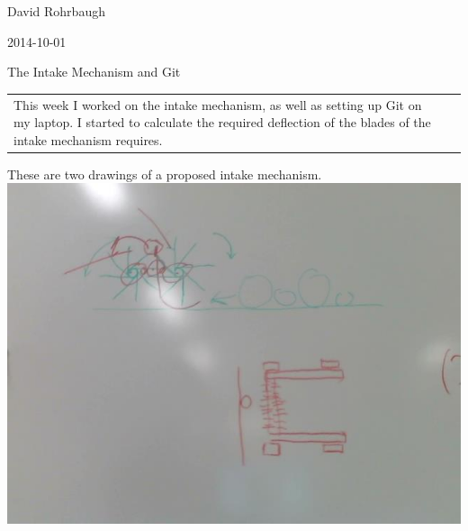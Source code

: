 David Rohrbaugh

2014-10-01

The Intake Mechanism and Git

\begin{tabular}{|p{5cm}|p{5cm}|}
 \hline
 This week I worked on the intake mechanism, as well as setting up Git on my laptop. I started to calculate the required deflection of the blades of the intake mechanism requires.
 \hline
\end{tabular}

These are two drawings of a proposed intake mechanism.
\includegraphics{./Images/intakeDrawing.jpg}
